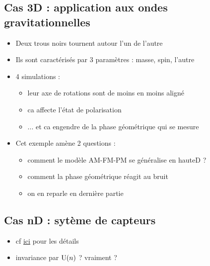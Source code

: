 \subsection{\todo Cas 3D : application aux ondes gravitationnelles} \label{subsec:ex-3D}

\begin{itemize}
	
	\item Deux trous noirs tournent autour l'un de l'autre
	
	\item Ils sont caractérisés par 3 paramètres : masse, spin, l'autre
	
	\item 4 simulations : \begin{itemize}
		
		\item leur axe de rotations sont de moins en moins aligné
		
		\item ca affecte l'état de polarisation 
		
		\item ... et ca engendre de la phase géométrique qui se mesure
	\end{itemize}
	
	\item Cet exemple amène 2 questions : \begin{itemize}
		
		\item comment le modèle AM-FM-PM se généralise en hauteD ?
		
		\item comment la phase géométrique réagit au bruit
		
		\item on en reparle en dernière partie

	\end{itemize}
\end{itemize}

\subsection{\todo Cas nD : sytème de capteurs} \label{subsec:ex-nD}

\begin{itemize}
	
	\item cf \href{https://theses.hal.science/tel-00199884}{ici} pour les détails
	
	\item invariance par $\text{\normalfont U}(n)$ ? vraiment ?
\end{itemize}



